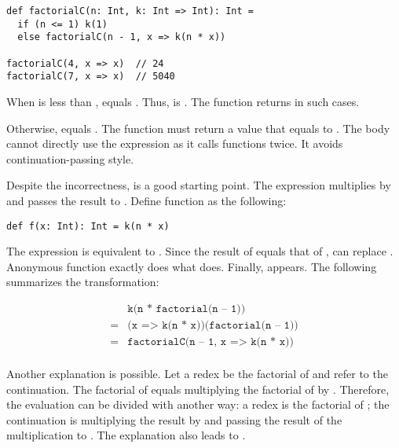 \begin{verbatim}
def factorialC(n: Int, k: Int => Int): Int =
  if (n <= 1) k(1)
  else factorialC(n - 1, x => k(n * x))

factorialC(4, x => x)  // 24
factorialC(7, x => x)  // 5040
\end{verbatim}

When  is less than ,  equals . Thus,
 is . The function returns  in such
cases.

Otherwise,  equals . The function
must return a value that equals to . The body
cannot directly use the expression as it calls functions twice. It avoids
continuation-passing style.

Despite the incorrectness,  is a good starting
point. The expression multiplies  by  and passes
the result to . Define function  as the following:

\begin{verbatim}
def f(x: Int): Int = k(n * x)
\end{verbatim}

The expression is equivalent to . Since the result of
 equals that of ,  can replace . Anonymous function  exactly does what  does. Finally,  appears. The following summarizes the transformation:

\[
\begin{array}{cl}
& \texttt{k(n * factorial(n – 1))} \\
= & \texttt{(x => k(n * x))(factorial(n – 1))} \\
= & \texttt{factorialC(n – 1, x => k(n * x))} \\
\end{array}
\]

Another explanation is possible. Let a redex be the factorial of  and
 refer to the continuation. The factorial of  equals multiplying
the factorial of  by . Therefore, the evaluation can be
divided with another way: a redex is the factorial of ; the
continuation is multiplying the result by  and passing the result of the
multiplication to . The explanation also leads to .


